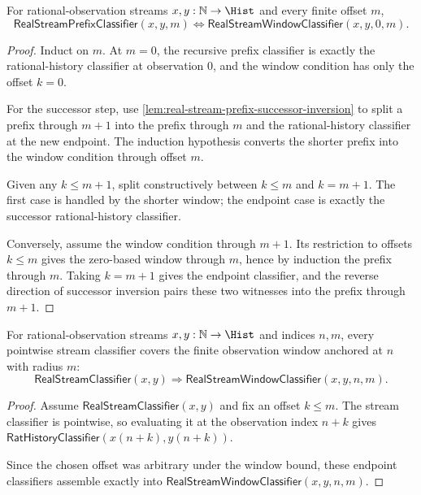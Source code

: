 \begin{theorem}
\label{thm:real-stream-prefix-window-exactness-at-zero}
For rational-observation streams $x,y:\mathbb{N}\to\Hist$ and every finite
offset $m$,
$$
\mathsf{RealStreamPrefixClassifier}(x,y,m)
\Longleftrightarrow
\mathsf{RealStreamWindowClassifier}(x,y,0,m).
$$
\end{theorem}
\begin{proof}
Induct on $m$. At $m=0$, the recursive prefix classifier is exactly the
rational-history classifier at observation $0$, and the window condition has
only the offset $k=0$.

For the successor step, use
\autoref{lem:real-stream-prefix-successor-inversion} to split a prefix through
$m+1$ into the prefix through $m$ and the rational-history classifier at the new
endpoint. The induction hypothesis converts the shorter prefix into the window
condition through offset $m$.

Given any $k\le m+1$, split constructively between $k\le m$ and $k=m+1$. The
first case is handled by the shorter window; the endpoint case is exactly the
successor rational-history classifier.

Conversely, assume the window condition through $m+1$. Its restriction to
offsets $k\le m$ gives the zero-based window through $m$, hence by induction the
prefix through $m$. Taking $k=m+1$ gives the endpoint classifier, and the reverse
direction of successor inversion pairs these two witnesses into the prefix
through $m+1$.
\end{proof}

\begin{theorem}
\label{thm:real-stream-classifier-finite-window-coverage}
For rational-observation streams $x,y:\mathbb{N}\to\Hist$ and indices $n,m$,
every pointwise stream classifier covers the finite observation window anchored
at $n$ with radius $m$:
$$
\mathsf{RealStreamClassifier}(x,y)
\Longrightarrow
\mathsf{RealStreamWindowClassifier}(x,y,n,m).
$$
\end{theorem}
\begin{proof}
Assume $\mathsf{RealStreamClassifier}(x,y)$ and fix an offset $k\le m$. The
stream classifier is pointwise, so evaluating it at the observation index $n+k$
gives $\mathsf{RatHistoryClassifier}(x(n+k),y(n+k))$.

Since the chosen offset was arbitrary under the window bound, these endpoint
classifiers assemble exactly into
$\mathsf{RealStreamWindowClassifier}(x,y,n,m)$.
\end{proof}

